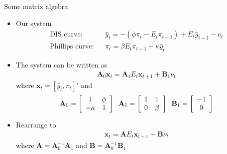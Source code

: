 \documentclass[9pt,xcolor={dvipsnames}]{beamer}
\newcommand{\bit}{\begin{itemize}}
\newcommand{\eit}{\end{itemize}}
\begin{document}
\begin{frame}{Some matrix algebra}

\bit
\setlength\itemsep{1.5em}

\item Our system
\begin{eqnarray}
\text{DIS curve:} && \hat y_t = - (\phi \pi_t -E_t \pi_{t+1}) + E_t \hat y_{t+1} - \nu_t \nonumber \\
\text{Phillips curve:} && \pi_t = \beta E_t \pi_{t+1} + \kappa \hat y_t \nonumber 
\end{eqnarray}

\item The system can be written as
\begin{eqnarray}
\mathbf A_0 \mathbf{x}_{t} = \mathbf A_1 E_t \mathbf x_{t+1} + \mathbf B_1 \nu_t \nonumber
\end{eqnarray}
where $\mathbf{x}_{t} = [\hat y_t, \pi_t]'$ and
\begin{eqnarray}
\mathbf A_0 = \left[\begin{array}{cc}
1 & \phi \\
-\kappa & 1
\end{array}\right] \hspace{2mm} \mathbf A_1 = \left[\begin{array}{cc}
1 & 1 \\
0 & \beta
\end{array}\right] \hspace{2mm} \mathbf B_1 = \left[\begin{array}{c}
-1 \\
0
\end{array}\right] \nonumber
\end{eqnarray}

\item Rearrange to
\begin{eqnarray}
\mathbf{x}_{t} = \mathbf A E_t \mathbf x_{t+1} + \mathbf{B} \nu_t \nonumber
\end{eqnarray}
where $\mathbf A = \mathbf A_0^{-1} \mathbf A_1$ and $\mathbf B =  \mathbf A_0^{-1} \mathbf B_1$ 

\eit

\end{frame}
\end{document}

